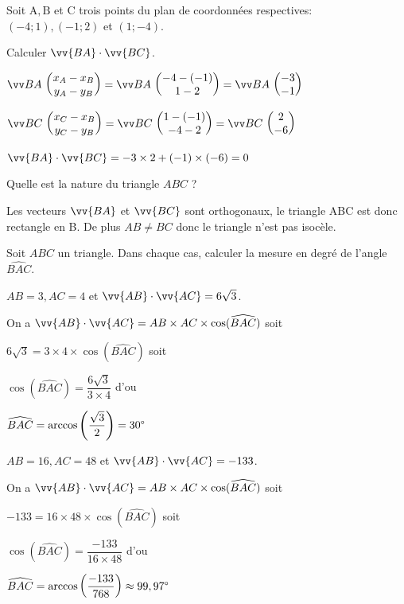 \documentclass[11pt,a4paper]{article}  %
\begin{document}
Soit $\mathrm{A}, \mathrm{B}$ et C trois points du plan de coordonnées respectives: $(-4 ; 1),(-1 ; 2)$ et $(1 ;-4)$.
\begin{enumMet}
	\item Calculer $\vv{B A} \cdot \vv{B C}$.
	\begin{corrBox}
		$\Coord{BA}{x_A-x_B}{y_A-y_B}=\Coord{BA}{-4-(-1)}{1-2}=\Coord{BA}{-3}{-1}$
		
		$ \Coord{BC}{x_C-x_B}{y_C-y_B}=\Coord{BC}{1-(-1)}{-4-2}=\Coord{BC}{2}{-6} $
		
		$\vv{B A} \cdot \vv{B C}=-3\times 2+(-1)\times (-6)=0$			
	\end{corrBox}
	\item Quelle est la nature du triangle $A B C$ ?
	\begin{corrBox}
		Les vecteurs $\vv{BA}$ et $\vv{BC}$	sont orthogonaux, le triangle ABC est donc rectangle en B. De plus $AB\neq BC$ donc le triangle n'est pas isocèle.	
	\end{corrBox}
\end{enumMet}

\exercice{}

Soit $A B C$ un triangle. Dans chaque cas, calculer la mesure en degré de l'angle $\widehat{B A C}$.
\begin{enumMet}
	\item $A B=3, A C=4$ et $\vv{A B} \cdot \vv{A C}=6 \sqrt{3}$.
	\begin{corrBox}
		On a $\vv{A B} \cdot \vv{A C}=AB\times AC\times \cos(\widehat{BAC})$ soit
		
		$6\sqrt{3}=3\times 4\times \cos(\widehat{BAC})$ soit
		
		$\cos(\widehat{BAC})=\dfrac{6\sqrt{3}}{3\times 4}$ d'ou
		
		$\widehat{BAC}=\arccos\left(\dfrac{\sqrt{3}}{2}\right)=30\degree$		
	\end{corrBox}
	\item $A B=16, A C=48$ et $\vv{A B} \cdot \vv{A C}=-133$.
	\begin{corrBox}
		On a $\vv{A B} \cdot \vv{A C}=AB\times AC\times \cos(\widehat{BAC})$ soit
		
		$-133=16\times 48\times \cos(\widehat{BAC})$ soit
		
		$\cos(\widehat{BAC})=\dfrac{-133}{16\times 48}$ d'ou
		
		$\widehat{BAC}=\arccos\left(\dfrac{-133}{768}\right)\approx99,97\degree$		
	\end{corrBox}
\end{enumMet}
\end{document}
